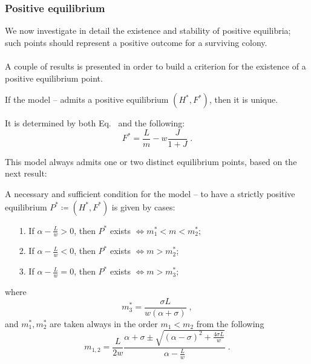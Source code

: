 \subsubsection{Positive equilibrium}
We now investigate in detail the existence and stability of positive equilibria; such points should represent a positive outcome for a surviving colony.

\paragraph{}
A couple of results is presented in order to build a criterion for the existence of a positive equilibrium point.

\begin{teorema}
    If the model -- admits a positive equilibrium $(H^*, F^*)$, then it is unique.

    It is determined by both Eq.~ and the following:
    \begin{equation}
        F^* = \frac{L}{m} - w \frac{J}{1+J} \; .
        \label{eq:kh11posEqF}
    \end{equation}

    \label{teo:exUniqFstarPos}
\end{teorema}

This model always admits one or two distinct equilibrium points, based on the next result:

\begin{teorema}
    A necessary and sufficient condition for the model -- to have a strictly positive equilibrium $P^* \coloneq (H^*, F^*)$ is given by cases:
    \begin{itemize}
        \item[1.] If $\alpha - \frac{L}{w} >0$, then $P^*$ exists $\iff m_1^* < m < m_2^*$;
        \item[2.] If $\alpha - \frac{L}{w} <0$, then $P^*$ exists $\iff m > m_2^*$;
        \item[3.] If $\alpha - \frac{L}{w} =0$, then $P^*$ exists $\iff m > m_3^*$;
    \end{itemize}
    where
    \begin{equation}
        m_3^* = \frac{ \sigma L}{ w (\alpha + \sigma) } \; ,
        \label{eq:FstarPosM3}
    \end{equation}
    and $m_1^*, m_2^*$ are taken always in the order $m_1 < m_2$ from the following
    \begin{equation}
        m_{1,2} = \frac{L}{2w} \frac{ \alpha + \sigma \pm \sqrt{ {(\alpha - \sigma)}^2 +\frac{4 \sigma L}{w}  } }
        {\alpha -\frac{L}{w}} \; .
        \label{eq:FstarPosM12}
    \end{equation}

    \label{teo:esistenzPosF}
\end{teorema}

